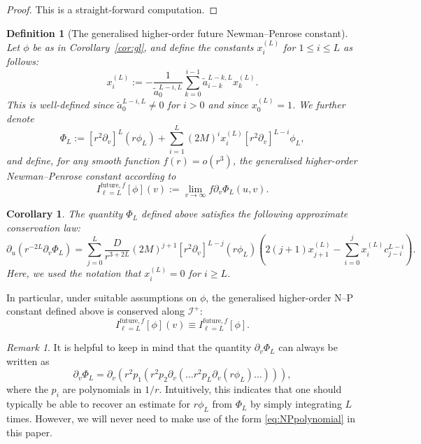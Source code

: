 \documentclass[11pt,english]{article}
\numberwithin{equation}{section}
\newtheorem{defi}{Definition}[section]
\newtheorem{cor}{Corollary}[section]
\theoremstyle{remark}
\newtheorem{rem}{Remark}[section]
\theoremstyle{plain}
\theoremstyle{remark}
\newcommand{\pu}{\partial_u}
\newcommand{\pv}{\partial_v}
\renewcommand{\(}{\left(}
\renewcommand{\)}{\right)}
\newcommand{\IL}[1]{I_{\ell=#1}^{\mathrm{future},f}}
\begin{document}
\begin{proof}This is a straight-forward computation.\end{proof}
\begin{defi}[The generalised higher-order future Newman--Penrose constant]
Let $\phi$ be as in Corollary~\ref{cor:gl}, and define the constants $x_i^{(L)}$ for $1\leq i\leq L$ as follows: 
\begin{equation}
x_i^{(L)}:=-\dfrac{1}{\tilde{a}_0^{L-i,L}}\sum_{k=0}^{i-1}\tilde{a}_{i-k}^{L-k,L}x^{(L)}_k.
\end{equation}
This is well-defined since $\tilde{a}_0^{L-i,L}\neq 0$ for $i>0$ and since $x^{(L)}_0=1$.  
We further denote
\begin{equation}\label{eq:NPfuture}
\Phi_{L}:=[r^2\pv]^L(r\phi_{L})+\sum_{i=1}^L(2M)^ix_i^{(L)}[r^2\pv]^{L-i}\phi_{L},
\end{equation}
and define, for any smooth function $f(r)=o(r^3)$, the generalised higher-order Newman--Penrose constant according to
\begin{equation}
\IL{L}[\phi](v):=\lim_{v\to\infty}f\pv\Phi_L(u,v).
\end{equation}
\end{defi}
\begin{cor}
The quantity $\Phi_{L}$ defined above satisfies the following approximate conservation law:
\begin{equation}\label{eq:gl:approx.u}
\pu(r^{-2L}\pv\Phi_L)
=\sum_{j=0}^L\frac{D}{r^{3+2L}}(2M)^{j+1}[r^2\pv]^{L-j}(r\phi_{L})\left(2(j+1)x^{(L)}_{j+1}-\sum_{i=0}^j x_i^{(L)} c_{j-i}^{L-i}\right) .
\end{equation}
Here, we used the notation that $x_i^{(L)}=0$ for $i\geq L$.
\end{cor}
In particular, under suitable assumptions on $\phi$, the generalised higher-order N--P constant defined above is conserved along $\mathcal{I}^+$:
\begin{equation}
 \IL{L}[\phi](v) \equiv \IL{L}[\phi] .
\end{equation}
\begin{rem}
It is helpful to keep in mind that the quantity $\pv\Phi_L$ can always be written as
\begin{equation}\label{eq:NPpolynomial}
\pv\Phi_L=\pv(r^2p_1(r^2p_2\pv(\dots r^2p_L\pv(r\phi_L)\dots))),
\end{equation}
where the $p_i$ are polynomials in $1/r$. Intuitively, this indicates that one should typically be able to recover an estimate for $r\phi_L$ from $\Phi_L$ by simply integrating $L$ times. However, we will never need to make use of the form \eqref{eq:NPpolynomial} in this paper.
\end{rem}
\end{document}
